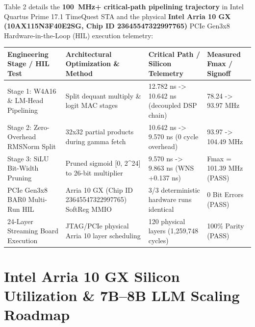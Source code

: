 \documentclass[11pt,a4paper]{article}
\begin{document}
Table 2 details the \textbf{100~MHz+ critical-path pipelining trajectory} in Intel Quartus Prime 17.1 TimeQuest STA and the physical \textbf{Intel Arria 10 GX (10AX115N3F40E2SG, Chip ID 23645547322997765)} PCIe Gen3x8 Hardware-in-the-Loop (HIL) execution telemetry:

{\footnotesize\renewcommand{\arraystretch}{1.14}\begin{longtable}{@{}L{0.23\textwidth}L{0.27\textwidth}L{0.24\textwidth}L{0.16\textwidth}@{}}\toprule

\textbf{Engineering Stage /\allowbreak{} HIL Test} & \textbf{Architectural Optimization \& Method} & \textbf{Critical Path /\allowbreak{} Silicon Telemetry} & \textbf{Measured Fmax /\allowbreak{} Signoff}\\\midrule\endhead

Stage 1: W4A16 \& LM-Head Pipelining & Split dequant multiply \& logit MAC stages & 12.782 ns -> 10.642 ns (\allowbreak{}decoupled DSP chain)\allowbreak{} & 78.24 -> 93.97 MHz\\[2pt]

Stage 2: Zero-Overhead RMSNorm Split & 32x32 partial products during gamma fetch & 10.642 ns -> 9.570 ns (\allowbreak{}0 cycle overhead)\allowbreak{} & 93.97 -> 104.49 MHz\\[2pt]

Stage 3: SiLU Bit-Width Pruning & Pruned sigmoid [\allowbreak{}0,\allowbreak{} 2\textasciicircum{}24]\allowbreak{} to 26-bit multiplier & 9.570 ns -> 9.863 ns (\allowbreak{}WNS +\allowbreak{}0.137 ns)\allowbreak{} & Fmax =\allowbreak{} 101.39 MHz (\allowbreak{}PASS)\allowbreak{}\\[2pt]

PCIe Gen3x8 BAR0 Multi-Run HIL & Arria 10 GX (\allowbreak{}Chip ID 23645547\allowbreak{}32299776\allowbreak{}5)\allowbreak{} SoftReg MMIO & 3/\allowbreak{}3 deterministic hardware runs identical & 0 Bit Errors (\allowbreak{}PASS)\allowbreak{}\\[2pt]

24-Layer Streaming Board Execution & JTAG/\allowbreak{}PCIe physical Arria 10 layer scheduling & 120 physical layers (\allowbreak{}1,\allowbreak{}259,\allowbreak{}748 cycles)\allowbreak{} & 100\% Parity (\allowbreak{}PASS)\allowbreak{}\\[2pt]

\bottomrule\end{longtable}}

\section{Intel Arria 10 GX Silicon Utilization \& 7B--8B LLM Scaling Roadmap}
\end{document}
